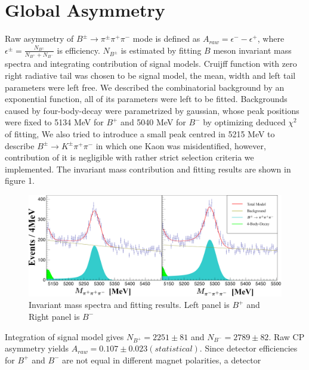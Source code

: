 \documentclass[12pt, twoside, notitlepage, twocolumn]{article}
\begin{document}
        \section{Global Asymmetry}
        Raw asymmetry of $B^{\pm}\rightarrow\pi^{\pm}\pi^{+}\pi^{-}$ mode is defined as $A_{raw} = \epsilon^--\epsilon^+$, 
        where $\epsilon^\pm = \frac{N_{B^\pm}}{N_{B^+}+N_{B^-}}$ is efficiency. $N_{B^\pm}$ is estimated by fitting $B$ 
        meson invariant mass spectra and integrating contribution of signal models. Cruijff function with zero right radiative 
        tail was chosen to be signal model, the mean, width and left tail parameters were left free. We described the combinatorial 
        background by an exponential function, all of its parameters were left to be fitted. Backgrounds caused by four-body-decay 
        were parametrized by gaussian, whose peak positions were fixed to 5134 MeV for $B^+$ and 5040 MeV for $B^-$ by optimizing 
        deduced $\chi^2$ of fitting, We also tried to introduce a small peak centred in 5215 MeV to describe 
        $B^{\pm}\rightarrow K^{\pm}\pi^{+}\pi^{-}$ in which one Kaon was misidentified, however, contribution of it is negligible 
        with rather strict selection criteria we implemented. The invariant mass contribution and fitting results are shown in figure 1.
        \begin{figure}[!hb]
            \begin{centering}
            \includegraphics[scale=0.276]{GA.png}
            \caption{Invariant mass spectra and fitting results. \newline Left panel is $B^+$ and Right panel is $B^-$}
            \end{centering}
            \label{fig:label1}
        \end{figure}
        Integration of signal model gives $N_{B^+} = 2251 \pm 81$ and $N_{B^-} = 2789 \pm 82$. Raw CP asymmetry yields $A_{raw}=0.107 
        \pm 0.023 (statistical)$. Since detector efficiencies for $B^+$ and $B^-$ are not equal in different magnet polarities, a detector 
\end{document}
